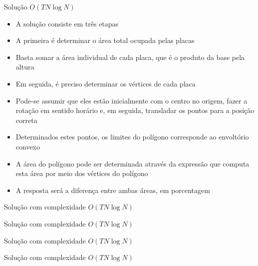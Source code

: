 \begin{frame}[fragile]{Solução $O(TN\log N)$}

    \begin{itemize}
        \item A solução consiste em três etapas

        \item A primeira é determinar o área total ocupada pelas placas

        \item Basta somar a área individual de cada placa, que é o produto da base pela altura

        \item Em seguida, é preciso determinar os vértices de cada placa

        \item Pode-se assumir que eles estão inicialmente com o centro no origem, fazer a 
            rotação em sentido horário e, em seguida, transladar os pontos para a posição
            correta

        \item Determinados estes pontos, os limites do polígono corresponde ao envoltório
            convexo

        \item A área do polígono pode ser determinada através da expressão que computa esta
            área por meio dos vértices do polígono

        \item A resposta será a diferença entre ambas áreas, em porcentagem
    \end{itemize}

\end{frame}

\begin{frame}[fragile]{Solução com complexidade $O(TN\log N)$}
\end{frame}

\begin{frame}[fragile]{Solução com complexidade $O(TN\log N)$}
\end{frame}

\begin{frame}[fragile]{Solução com complexidade $O(TN\log N)$}
\end{frame}

\begin{frame}[fragile]{Solução com complexidade $O(TN\log N)$}
\end{frame}

